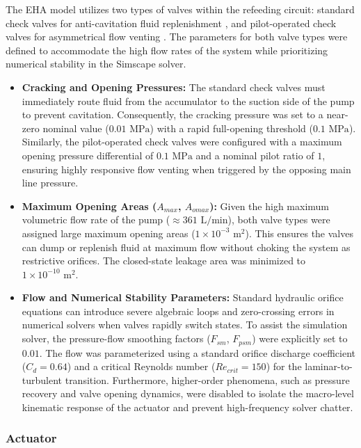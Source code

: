 \documentclass[
bindingoffset=5mm,  %
footnoteindent=3mm, %
hyphenation=true    %
]{src/wut-thesis}
\begin{document}
	The EHA model utilizes two types of valves within the refeeding circuit: standard check valves for anti-cavitation fluid replenishment \cite{mw:checkvalve}, and pilot-operated check valves for asymmetrical flow venting \cite{mw:pilotcheckvalve}. The parameters for both valve types were defined to accommodate the high flow rates of the system while prioritizing numerical stability in the Simscape solver.
	
	\begin{itemize}
		\item \textbf{Cracking and Opening Pressures:} The standard check valves must immediately route fluid from the accumulator to the suction side of the pump to prevent cavitation. Consequently, the cracking pressure was set to a near-zero nominal value ($0.01 \text{ MPa}$) with a rapid full-opening threshold ($0.1 \text{ MPa}$). Similarly, the pilot-operated check valves were configured with a maximum opening pressure differential of $0.1 \text{ MPa}$ and a nominal pilot ratio of $1$, ensuring highly responsive flow venting when triggered by the opposing main line pressure.
		
		\item \textbf{Maximum Opening Areas ($A_{max}$, $A_{omax}$):} Given the high maximum volumetric flow rate of the pump ($\approx 361 \text{ L/min}$), both valve types were assigned large maximum opening areas ($1 \times 10^{-3} \text{ m}^2$). This ensures the valves can dump or replenish fluid at maximum flow without choking the system as restrictive orifices. The closed-state leakage area was minimized to $1 \times 10^{-10} \text{ m}^2$.
		
		\item \textbf{Flow and Numerical Stability Parameters:} Standard hydraulic orifice equations can introduce severe algebraic loops and zero-crossing errors in numerical solvers when valves rapidly switch states. To assist the simulation solver, the pressure-flow smoothing factors ($F_{sm}$, $F_{psm}$) were explicitly set to $0.01$. The flow was parameterized using a standard orifice discharge coefficient ($C_{d} = 0.64$) and a critical Reynolds number ($Re_{crit} = 150$) for the laminar-to-turbulent transition. Furthermore, higher-order phenomena, such as pressure recovery and valve opening dynamics, were disabled to isolate the macro-level kinematic response of the actuator and prevent high-frequency solver chatter.
	\end{itemize}
	
	\subsubsection{Actuator}
	
\end{document}
